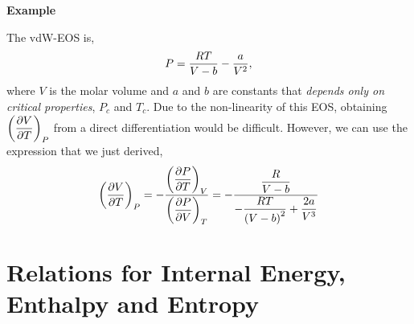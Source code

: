 \begin{MyExample}{\begin{center}{\bf Example}\end{center}}
     \medskip\noindent
     The vdW-EOS is,
     \begin{displaymath}
          P = \frc{RT}{V-b} - \frc{a}{V^{2}},
     \end{displaymath}
     where $V$ is the molar volume and $a$ and $b$ are constants that {\it depends only on critical properties}, $P_{c}$ and $T_{c}$. Due to the non-linearity of this EOS, obtaining $\Partial[V]{T}{P}$ from a direct differentiation would be difficult. However, we can use the expression that we just derived,
     \begin{displaymath}
         \Partial[V]{T}{P} = -\frc{\Partial[P]{T}{V}}{\Partial[P]{V}{T}} = -\frc{\frc{R}{V-b}}{-\frc{RT}{\left(V-b\right)^{2}}+\frc{2a}{V^{3}}}
     \end{displaymath} 

   \end{MyExample}


   \section{Relations for Internal Energy, Enthalpy and Entropy}\label{Chapter:ThermodynamicPropertiesPureFluids:Section:U_H_S_Relations}

